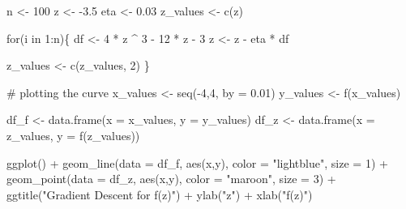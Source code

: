 \documentclass[
  letterpaper,
  DIV=11,
  numbers=noendperiod]{scrartcl}
\newenvironment{Shaded}{\begin{snugshade}}{\end{snugshade}}
\newcommand{\AttributeTok}[1]{\textcolor[rgb]{0.40,0.45,0.13}{#1}}
\newcommand{\CommentTok}[1]{\textcolor[rgb]{0.37,0.37,0.37}{#1}}
\newcommand{\ControlFlowTok}[1]{\textcolor[rgb]{0.00,0.23,0.31}{#1}}
\newcommand{\DecValTok}[1]{\textcolor[rgb]{0.68,0.00,0.00}{#1}}
\newcommand{\FloatTok}[1]{\textcolor[rgb]{0.68,0.00,0.00}{#1}}
\newcommand{\FunctionTok}[1]{\textcolor[rgb]{0.28,0.35,0.67}{#1}}
\newcommand{\NormalTok}[1]{\textcolor[rgb]{0.00,0.23,0.31}{#1}}
\newcommand{\OtherTok}[1]{\textcolor[rgb]{0.00,0.23,0.31}{#1}}
\newcommand{\SpecialCharTok}[1]{\textcolor[rgb]{0.37,0.37,0.37}{#1}}
\newcommand{\StringTok}[1]{\textcolor[rgb]{0.13,0.47,0.30}{#1}}
\begin{document}
\begin{Shaded}
\begin{Highlighting}[]
\NormalTok{n }\OtherTok{\textless{}{-}} \DecValTok{100}
\NormalTok{z }\OtherTok{\textless{}{-}} \SpecialCharTok{{-}}\FloatTok{3.5}
\NormalTok{eta }\OtherTok{\textless{}{-}} \FloatTok{0.03}
\NormalTok{z\_values }\OtherTok{\textless{}{-}} \FunctionTok{c}\NormalTok{(z)}

\ControlFlowTok{for}\NormalTok{(i }\ControlFlowTok{in} \DecValTok{1}\SpecialCharTok{:}\NormalTok{n)\{}
\NormalTok{  df }\OtherTok{\textless{}{-}} \DecValTok{4} \SpecialCharTok{*}\NormalTok{ z }\SpecialCharTok{\^{}} \DecValTok{3} \SpecialCharTok{{-}} \DecValTok{12} \SpecialCharTok{*}\NormalTok{ z }\SpecialCharTok{{-}} \DecValTok{3}
\NormalTok{  z }\OtherTok{\textless{}{-}}\NormalTok{ z }\SpecialCharTok{{-}}\NormalTok{ eta }\SpecialCharTok{*}\NormalTok{ df}
  
\NormalTok{  z\_values }\OtherTok{\textless{}{-}} \FunctionTok{c}\NormalTok{(z\_values, }\DecValTok{2}\NormalTok{)}
\NormalTok{\}}

\CommentTok{\# plotting the curve}
\NormalTok{x\_values }\OtherTok{\textless{}{-}} \FunctionTok{seq}\NormalTok{(}\SpecialCharTok{{-}}\DecValTok{4}\NormalTok{,}\DecValTok{4}\NormalTok{, }\AttributeTok{by =} \FloatTok{0.01}\NormalTok{)}
\NormalTok{y\_values }\OtherTok{\textless{}{-}} \FunctionTok{f}\NormalTok{(x\_values)}

\NormalTok{df\_f }\OtherTok{\textless{}{-}} \FunctionTok{data.frame}\NormalTok{(}\AttributeTok{x =}\NormalTok{ x\_values, }\AttributeTok{y =}\NormalTok{ y\_values)}
\NormalTok{df\_z }\OtherTok{\textless{}{-}} \FunctionTok{data.frame}\NormalTok{(}\AttributeTok{x =}\NormalTok{ z\_values, }\AttributeTok{y =} \FunctionTok{f}\NormalTok{(z\_values))}

\FunctionTok{ggplot}\NormalTok{() }\SpecialCharTok{+} 
  \FunctionTok{geom\_line}\NormalTok{(}\AttributeTok{data =}\NormalTok{ df\_f, }\FunctionTok{aes}\NormalTok{(x,y), }\AttributeTok{color =} \StringTok{"lightblue"}\NormalTok{,    }\AttributeTok{size =} \DecValTok{1}\NormalTok{) }\SpecialCharTok{+} 
  \FunctionTok{geom\_point}\NormalTok{(}\AttributeTok{data =}\NormalTok{ df\_z, }\FunctionTok{aes}\NormalTok{(x,y), }\AttributeTok{color =} \StringTok{"maroon"}\NormalTok{,      }\AttributeTok{size =} \DecValTok{3}\NormalTok{) }\SpecialCharTok{+} 
  \FunctionTok{ggtitle}\NormalTok{(}\StringTok{"Gradient Descent for f(z)"}\NormalTok{) }\SpecialCharTok{+} 
  \FunctionTok{ylab}\NormalTok{(}\StringTok{"z"}\NormalTok{) }\SpecialCharTok{+} 
  \FunctionTok{xlab}\NormalTok{(}\StringTok{"f(z)"}\NormalTok{)}
\end{Highlighting}
\end{Shaded}
\end{document}
